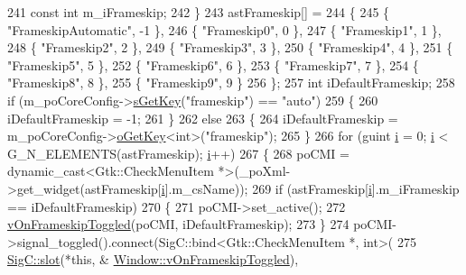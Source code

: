 \begin{DoxyCode}
{{241     \textcolor{keyword}{const} \textcolor{keywordtype}{int}    m\_iFrameskip;
242   \}
243   astFrameskip[] =
244   \{
245     \{ \textcolor{stringliteral}{"FrameskipAutomatic"}, -1 \},
246     \{ \textcolor{stringliteral}{"Frameskip0"},          0 \},
247     \{ \textcolor{stringliteral}{"Frameskip1"},          1 \},
248     \{ \textcolor{stringliteral}{"Frameskip2"},          2 \},
249     \{ \textcolor{stringliteral}{"Frameskip3"},          3 \},
250     \{ \textcolor{stringliteral}{"Frameskip4"},          4 \},
251     \{ \textcolor{stringliteral}{"Frameskip5"},          5 \},
252     \{ \textcolor{stringliteral}{"Frameskip6"},          6 \},
253     \{ \textcolor{stringliteral}{"Frameskip7"},          7 \},
254     \{ \textcolor{stringliteral}{"Frameskip8"},          8 \},
255     \{ \textcolor{stringliteral}{"Frameskip9"},          9 \}
256   \};
257   \textcolor{keywordtype}{int} iDefaultFrameskip;
258   \textcolor{keywordflow}{if} (m\_poCoreConfig->\mbox{\hyperlink{class_v_b_a_1_1_config_1_1_section_a7ac9dfabf38bc1db83a6017e130f04ac}{sGetKey}}(\textcolor{stringliteral}{"frameskip"}) == \textcolor{stringliteral}{"auto"})
259   \{
260     iDefaultFrameskip = -1;
261   \}
262   \textcolor{keywordflow}{else}
263   \{
264     iDefaultFrameskip = m\_poCoreConfig->\mbox{\hyperlink{class_v_b_a_1_1_config_1_1_section_ab169d7aae4e9dde91418ba1668e3ad39}{oGetKey}}<\textcolor{keywordtype}{int}>(\textcolor{stringliteral}{"frameskip"});
265   \}
266   \textcolor{keywordflow}{for} (guint \mbox{\hyperlink{expr-lex_8cpp_acb559820d9ca11295b4500f179ef6392}{i}} = 0; \mbox{\hyperlink{expr-lex_8cpp_acb559820d9ca11295b4500f179ef6392}{i}} < G\_N\_ELEMENTS(astFrameskip); \mbox{\hyperlink{expr-lex_8cpp_acb559820d9ca11295b4500f179ef6392}{i}}++)
267   \{
268     poCMI = \textcolor{keyword}{dynamic\_cast<}Gtk::CheckMenuItem *\textcolor{keyword}{>}(\_poXml->get\_widget(astFrameskip[\mbox{\hyperlink{expr-lex_8cpp_acb559820d9ca11295b4500f179ef6392}{i}}].m\_csName));
269     \textcolor{keywordflow}{if} (astFrameskip[\mbox{\hyperlink{expr-lex_8cpp_acb559820d9ca11295b4500f179ef6392}{i}}].m\_iFrameskip == iDefaultFrameskip)
270     \{
271       poCMI->set\_active();
272       \mbox{\hyperlink{class_v_b_a_1_1_window_a1d969d55fcb1a69d13d3a29c9365e699}{vOnFrameskipToggled}}(poCMI, iDefaultFrameskip);
273     \}
274     poCMI->signal\_toggled().connect(SigC::bind<Gtk::CheckMenuItem *, int>(
275                                       \mbox{\hyperlink{namespace_sig_c_a92e4f19202b77e78ac1db05f5a62f6b6}{SigC::slot}}(*\textcolor{keyword}{this}, &
      \mbox{\hyperlink{class_v_b_a_1_1_window_a1d969d55fcb1a69d13d3a29c9365e699}{Window::vOnFrameskipToggled}}),
}}
\end{DoxyCode}
